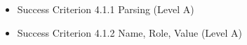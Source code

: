 \documentclass{master_thesis}
\begin{document}
\begin{itemize}
	\item Success Criterion 4.1.1 Parsing (Level A)

	\item Success Criterion 4.1.2 Name, Role, Value (Level A)


\end{itemize}
\end{document}
